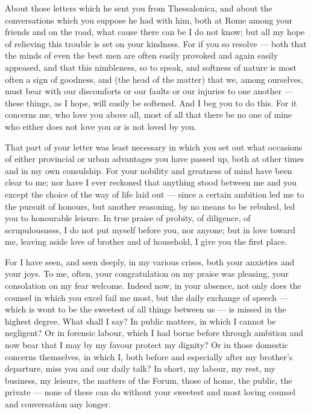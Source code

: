  About those letters which he sent you from Thessalonica, and about the conversations which you suppose he had with him, both at Rome among your friends and on the road, what cause there can be I do not know; but all my hope of relieving this trouble is set on your kindness. For if you so resolve --- both that the minds of even the best men are often easily provoked and again easily appeased, and that this nimbleness, so to speak, and softness of nature is most often a sign of goodness, and (the head of the matter) that we, among ourselves, must bear with our discomforts or our faults or our injuries to one another --- these things, as I hope, will easily be softened. And I beg you to do this. For it concerns me, who love you above all, most of all that there be no one of mine who either does not love you or is not loved by you.

 That part of your letter was least necessary in which you set out what occasions of either provincial or urban advantages you have passed up, both at other times and in my own consulship. For your nobility and greatness of mind have been clear to me; nor have I ever reckoned that anything stood between me and you except the choice of the way of life laid out --- since a certain ambition led me to the pursuit of honours, but another reasoning, by no means to be rebuked, led you to honourable leisure. In true praise of probity, of diligence, of scrupulousness, I do not put myself before you, nor anyone; but in love toward me, leaving aside love of brother and of household, I give you the first place.

 For I have seen, and seen deeply, in my various crises, both your anxieties and your joys. To me, often, your congratulation on my praise was pleasing, your consolation on my fear welcome. Indeed now, in your absence, not only does the counsel in which you excel fail me most, but the daily exchange of speech --- which is wont to be the sweetest of all things between us --- is missed in the highest degree. What shall I say? In public matters, in which I cannot be negligent? Or in forensic labour, which I had borne before through ambition and now bear that I may by my favour protect my dignity? Or in those domestic concerns themselves, in which I, both before and especially after my brother's departure, miss you and our daily talk? In short, my labour, my rest, my business, my leisure, the matters of the Forum, those of home, the public, the private --- none of these can do without your sweetest and most loving counsel and conversation any longer.

